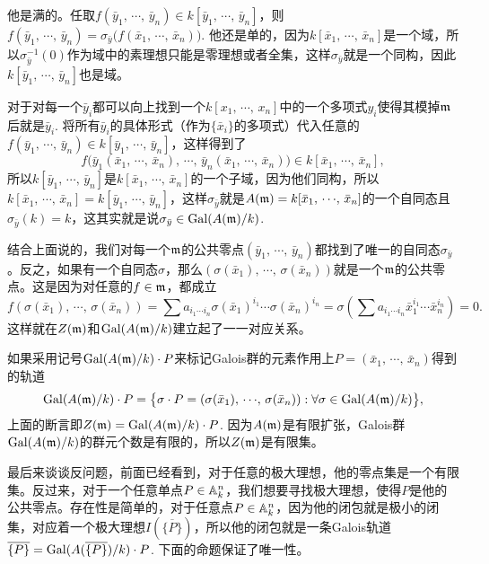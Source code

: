 他是满的。任取$f(\bar{y}_1,\,\cdots\!,\,\bar{y}_n)\in k[\bar{y}_1,\,\cdots\!,\,\bar{y}_n]$，则$f(\bar{y}_1,\,\cdots\!,\,\bar{y}_n)=\sigma_{\bar{y}}\bigl(f(\bar{x}_1,\,\cdots\!,\,\bar{x}_n)\bigr)$. 
他还是单的，因为$k[\bar{x}_1,\,\cdots\!,\,\bar{x}_n]$是一个域，所以$\sigma_{\bar{y}}^{-1}(0)$作为域中的素理想只能是零理想或者全集，这样$\sigma_{\bar{y}}$就是一个同构，因此$k[\bar{y}_1,\,\cdots\!,\,\bar{y}_n]$也是域。

对于对每一个$\bar{y}_i$都可以向上找到一个$k[x_1,\,\cdots\!,\,x_n]$中的一个多项式$y_i$使得其模掉$\mathfrak{m}$后就是$\bar{y}_i$.
将所有$\bar{y}_i$的具体形式（作为$\{\bar{x}_i\}$的多项式）代入任意的$f(\bar{y}_1,\,\cdots\!,\,\bar{y}_n) \in k[\bar{y}_1,\,\cdots\!,\,\bar{y}_n]$，这样得到了
\[
	f\bigl(\bar{y}_1(\bar{x}_1,\,\cdots\!,\,\bar{x}_n),\,\cdots\!,\,\bar{y}_n(\bar{x}_1,\,\cdots\!,\,\bar{x}_n)\bigr) \in k[\bar{x}_1,\,\cdots\!,\,\bar{x}_n],
\]
所以$k[\bar{y}_1,\,\cdots\!,\,\bar{y}_n]$是$k[\bar{x}_1,\,\cdots\!,\,\bar{x}_n]$的一个子域，因为他们同构，所以$k[\bar{x}_1,\,\cdots\!,\,\bar{x}_n]=k[\bar{y}_1,\,\cdots\!,\,\bar{y}_n]$，这样$\sigma_{\bar{y}}$就是$A(\mathfrak{m})=k[\bar{x}_1,\,\cdots\!,\,\bar{x}_n]$的一个自同态且$\sigma_{\bar{y}}(k)=k$，这其实就是说$\sigma_{\bar{y}}\in \operatorname{Gal}(A(\mathfrak{m})/k)$.

结合上面说的，我们对每一个$\mathfrak{m}$的公共零点$(\bar{y}_1,\,\cdots\!,\,\bar{y}_n)$都找到了唯一的自同态$\sigma_{\bar{y}}$。反之，如果有一个自同态$\sigma$，那么$(\sigma(\bar{x}_1),\,\cdots\!,\,\sigma(\bar{x}_n))$就是一个$\mathfrak{m}$的公共零点。这是因为对任意的$f\in\mathfrak{m}$，都成立
\[
	f(\sigma(\bar{x}_1),\,\cdots\!,\,\sigma(\bar{x}_n))=\sum a_{i_1\cdots i_n} \sigma({\bar{x}}_1)^{i_1}\cdots \sigma({\bar{x}}_n)^{i_n}=\sigma\left(\sum a_{i_1\cdots i_n} \bar{x}_1^{i_1}\cdots \bar{x}_n^{i_n}\right)=0.
\]
这样就在$Z(\mathfrak{m})$和$\operatorname{Gal}(A(\mathfrak{m})/k)$建立起了一一对应关系。

\para 如果采用记号$\operatorname{Gal}(A(\mathfrak{m})/k)\cdot P$来标记Galois群的元素作用上$P=(\bar{x}_1,\,\cdots\!,\,\bar{x}_n)$得到的轨道
\[
	\operatorname{Gal}(A(\mathfrak{m})/k)\cdot P=\bigl\{\sigma\cdot P=(\sigma(\bar{x}_1),\,\cdots\!,\,\sigma(\bar{x}_n)):\forall \sigma\in \operatorname{Gal}(A(\mathfrak{m})/k)\bigr\},
\]
上面的断言即$Z(\mathfrak{m})=\operatorname{Gal}(A(\mathfrak{m})/k)\cdot P$. 因为$A(\mathfrak{m})$是有限扩张，Galois群$\operatorname{Gal}(A(\mathfrak{m})/k)$的群元个数是有限的，所以$Z(\mathfrak{m})$是有限集。

最后来谈谈反问题，前面已经看到，对于任意的极大理想，他的零点集是一个有限集。反过来，对于一个任意单点$P\in \mathbb{A}^n_k$，我们想要寻找极大理想，使得$P$是他的公共零点。存在性是简单的，对于任意点$P\in \mathbb{A}^n_k$，因为他的闭包就是极小的闭集，对应着一个极大理想$I(\overline{\{P\}})$，所以他的闭包就是一条Galois轨道$\overline{\{P\}}=\operatorname{Gal}(A(\overline{\{P\}})/k)\cdot P$. 下面的命题保证了唯一性。

